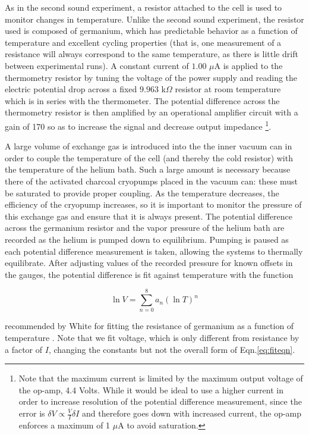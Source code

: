 As in the second sound experiment, a resistor attached to the cell is
used to monitor changes in temperature. Unlike the second sound
experiment, the resistor used is composed of germanium, which has
predictable behavior as a function of temperature and excellent
cycling properties (that is, one measurement of a resistance will
always correspond to the same temperature, as there is little drift
between experimental runs). A constant current of $1.00$ $\mu$A is
applied to the thermometry resistor by tuning the voltage of the power
supply and reading the electric potential drop across a fixed $9.963$
k$\Omega$ resistor at room temperature which is in series with the
thermometer. The potential difference across the thermometry resistor
is then amplified by an operational amplifier circuit with a gain of
170 so as to increase the signal and decrease output impedance
\footnote{Note that the maximum current is limited by the maximum
  output voltage of the op-amp, 4.4 Volts. While it would be ideal to
  use a higher current in order to increase resolution of the
  potential difference measurement, since the error is $\delta V
  \propto \frac{V}{I} \delta I$ and therefore goes down with increased
  current, the op-amp enforces a maximum of 1 $\mu$A to avoid
  saturation.}. 

A large volume of exchange gas is introduced into the the inner vacuum
can in order to couple the temperature of the cell (and thereby the
cold resistor) with the temperature of the helium bath. Such a large
amount is necessary because there of the activated charcoal cryopumps
placed in the vacuum can: these must be saturated to provide proper
coupling. As the temperature decreases, the efficiency of the cryopump
increases, so it is important to monitor the pressure of this exchange
gas and ensure that it is always present. The potential difference
across the germanium resistor and the vapor pressure of the helium
bath are recorded as the helium is pumped down to equilibrium. Pumping
is paused as each potential difference measurement is taken, allowing
the systems to thermally equilibrate. After adjusting values of the
recorded pressure for known offsets in the gauges, the potential
difference is fit against temperature with the function

\begin{equation}
\label{eq:fiteqn}
\ln{V} = \sum_{n=0}^{8} a_{n} (\ln{T})^{n}
\end{equation}

recommended by White for fitting the resistance of germanium as a
function of temperature \cite{white}. Note that we fit voltage, which
is only different from resistance by a factor of $I$, changing the
constants but not the overall form of Eqn.\ref{eq:fiteqn}.

